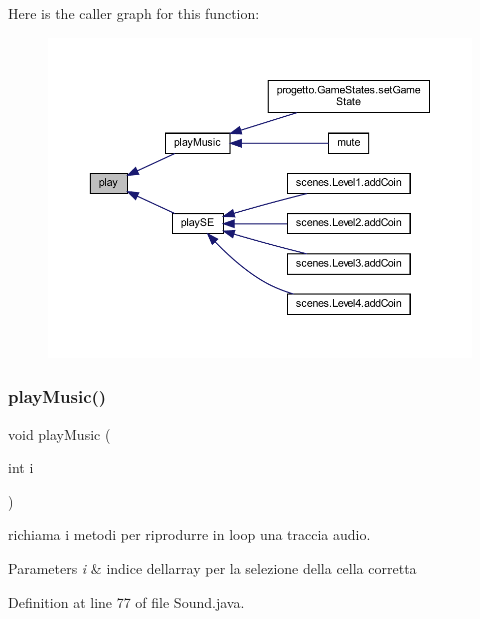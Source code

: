Here is the caller graph for this function\+:\nopagebreak
\begin{figure}[H]
\begin{center}
\leavevmode
\includegraphics[width=350pt]{classprogetto_1_1_sound_a6d58098c6cf63c241ed03bc797256bb1_icgraph}
\end{center}
\end{figure}
\mbox{\label{classprogetto_1_1_sound_afbebd3583bea93ca3867632861ec5801}} 
\subsubsection{\texorpdfstring{play\+Music()}{playMusic()}}
{\footnotesize\ttfamily void play\+Music (\begin{DoxyParamCaption}\item[{int}]{i }\end{DoxyParamCaption})}



richiama i metodi per riprodurre in loop una traccia audio. 


\begin{DoxyParams}{Parameters}
{\em i} & indice dell\textquotesingle{}array per la selezione della cella corretta \\
\hline
\end{DoxyParams}


Definition at line 77 of file Sound.\+java.

